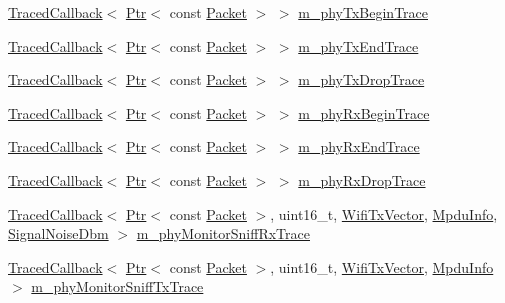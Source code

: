 \begin{DoxyCompactItemize}
\item 
\hyperlink{classns3_1_1TracedCallback}{Traced\+Callback}$<$ \hyperlink{classns3_1_1Ptr}{Ptr}$<$ const \hyperlink{classns3_1_1Packet}{Packet} $>$ $>$ \hyperlink{classns3_1_1WifiPhy_adf60437bb052fa372a0cfa487a705620}{m\+\_\+phy\+Tx\+Begin\+Trace}
\item 
\hyperlink{classns3_1_1TracedCallback}{Traced\+Callback}$<$ \hyperlink{classns3_1_1Ptr}{Ptr}$<$ const \hyperlink{classns3_1_1Packet}{Packet} $>$ $>$ \hyperlink{classns3_1_1WifiPhy_a89be9fb17763c992ab79667c877db0bb}{m\+\_\+phy\+Tx\+End\+Trace}
\item 
\hyperlink{classns3_1_1TracedCallback}{Traced\+Callback}$<$ \hyperlink{classns3_1_1Ptr}{Ptr}$<$ const \hyperlink{classns3_1_1Packet}{Packet} $>$ $>$ \hyperlink{classns3_1_1WifiPhy_a17b4a316c4fd6feac22b5abb38da689e}{m\+\_\+phy\+Tx\+Drop\+Trace}
\item 
\hyperlink{classns3_1_1TracedCallback}{Traced\+Callback}$<$ \hyperlink{classns3_1_1Ptr}{Ptr}$<$ const \hyperlink{classns3_1_1Packet}{Packet} $>$ $>$ \hyperlink{classns3_1_1WifiPhy_ac33ef626eeaa5283e7497bbbc8591a86}{m\+\_\+phy\+Rx\+Begin\+Trace}
\item 
\hyperlink{classns3_1_1TracedCallback}{Traced\+Callback}$<$ \hyperlink{classns3_1_1Ptr}{Ptr}$<$ const \hyperlink{classns3_1_1Packet}{Packet} $>$ $>$ \hyperlink{classns3_1_1WifiPhy_a49fafa73ef1e41ad7f93e792f523dfdd}{m\+\_\+phy\+Rx\+End\+Trace}
\item 
\hyperlink{classns3_1_1TracedCallback}{Traced\+Callback}$<$ \hyperlink{classns3_1_1Ptr}{Ptr}$<$ const \hyperlink{classns3_1_1Packet}{Packet} $>$ $>$ \hyperlink{classns3_1_1WifiPhy_a4ed70c61781e7d5de9ae5bb16c613fb8}{m\+\_\+phy\+Rx\+Drop\+Trace}
\item 
\hyperlink{classns3_1_1TracedCallback}{Traced\+Callback}$<$ \hyperlink{classns3_1_1Ptr}{Ptr}$<$ const \hyperlink{classns3_1_1Packet}{Packet} $>$, uint16\+\_\+t, \hyperlink{classns3_1_1WifiTxVector}{Wifi\+Tx\+Vector}, \hyperlink{structns3_1_1MpduInfo}{Mpdu\+Info}, \hyperlink{structns3_1_1SignalNoiseDbm}{Signal\+Noise\+Dbm} $>$ \hyperlink{classns3_1_1WifiPhy_ae1bb9ca40837a43219f2be0aadbdc02b}{m\+\_\+phy\+Monitor\+Sniff\+Rx\+Trace}
\item 
\hyperlink{classns3_1_1TracedCallback}{Traced\+Callback}$<$ \hyperlink{classns3_1_1Ptr}{Ptr}$<$ const \hyperlink{classns3_1_1Packet}{Packet} $>$, uint16\+\_\+t, \hyperlink{classns3_1_1WifiTxVector}{Wifi\+Tx\+Vector}, \hyperlink{structns3_1_1MpduInfo}{Mpdu\+Info} $>$ \hyperlink{classns3_1_1WifiPhy_ab11e6362f76c35f9a4c467c6c7765861}{m\+\_\+phy\+Monitor\+Sniff\+Tx\+Trace}

\end{DoxyCompactItemize}
